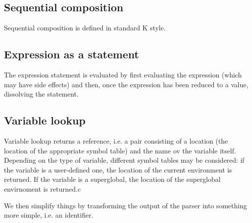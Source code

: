 \documentclass{article}
\begin{document}
\begin{kdefinition}
\begin{module}{}
\begin{kblock}[text]
 \subsection{Sequential composition} 
		Sequential composition is defined in standard K style. \end{kblock}
\begin{kblock}[text]
 \subsection{Expression as a statement} 
		The expression statement is evaluated by first evaluating the expression (which may 
		have side effects) and then, once the expression has been reduced to a value, 
		dissolving the statement. \end{kblock}
\begin{kblock}[text]
 \subsection{Variable lookup} 
		Variable lookup returns a reference, i.e. a pair consisting of a location (the location 
		of the appropriate symbol table) and the name ov the variable itself. 
		Depending on the type of variable, different symbol tables may be considered: if 
		the variable is a user-defined one, the location of the current environment is returned. 
		If the variable is a superglobal, the location of the superglobal envirnoment is 
		returned.c \end{kblock}
\begin{kblock}[text]
 We then simplify things by transforming the output of the parser into something more 
	simple, i.e. an identifier. \end{kblock}


\end{module}
\end{kdefinition}
\end{document}
